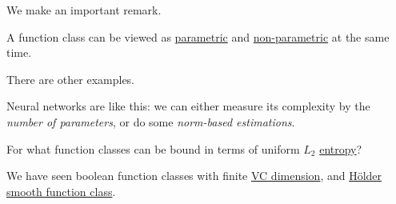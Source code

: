 We make an important remark.

\begin{remark}
	A function class can be viewed as \hyperref[def:parametric]{parametric} and \hyperref[def:non-parametric]{non-parametric} at the same time.
\end{remark}

There are other examples.

\begin{eg}
	Neural networks are like this: we can either measure its complexity by the \emph{number of parameters}, or do some \emph{norm-based estimations}.
\end{eg}

\begin{problem*}
	For what function classes can be bound in terms of uniform \(L_2\) \hyperref[def:metric-entropy]{entropy}?
\end{problem*}
\begin{answer}
	We have seen boolean function classes with finite \hyperref[def:VC-dimension]{VC dimension}, and \hyperref[def:Holder-smooth-function-class]{Hölder smooth function class}.
\end{answer}